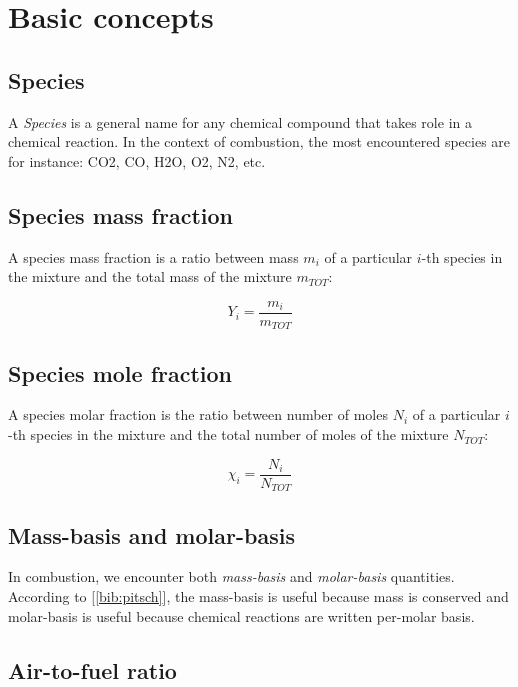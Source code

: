 \documentclass[10pt,twocolumn]{article}
\begin{document}
\section{Basic concepts}

\subsection{Species}

A \textit{Species} is a general name for any chemical compound that takes role in a chemical reaction. In the context of combustion, the most encountered species are for instance: CO2, CO, H2O, O2, N2, etc.

\subsection{Species mass fraction}

A species mass fraction is a ratio between mass $m_i$ of a particular $i$-th species in the mixture and the total mass of the mixture $m_{TOT}$:

\begin{equation}
Y_i = \frac{m_i}{m_{TOT}}
\end{equation}

\subsection{Species mole fraction}

A species molar fraction is the ratio between number of moles $N_i$ of a particular $i$-th species in the mixture and the total number of moles of the mixture $N_{TOT}$:

\begin{equation}
\chi_i = \frac{N_i}{N_{TOT}}
\end{equation}

\subsection{Mass-basis and molar-basis}

In combustion, we encounter both \textit{mass-basis} and \textit{molar-basis} quantities. According to [\ref{bib:pitsch}], the mass-basis is useful because mass is conserved and molar-basis is useful because chemical reactions are written per-molar basis.

\subsection{Air-to-fuel ratio}
\end{document}
